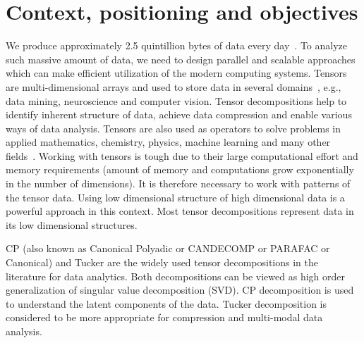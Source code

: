 \documentclass[a4paper,11pt]{article}
\newcommand{\sk}[1]{{\color{blue} \emph{#1}}}
\begin{document}
	\section{Context, positioning and objectives}
	\label{sec:context}
	
	
	We produce approximately 2.5 quintillion bytes of data every day~\cite{data-size}. To analyze such massive amount of data, we need to design parallel and scalable approaches which can make efficient utilization of the modern computing systems. Tensors are multi-dimensional arrays and used to store data in several domains~\cite{KB-SIAM-2009}, e.g., data mining, neuroscience and computer vision. Tensor decompositions help to identify inherent structure of data, achieve data compression and enable various ways of data analysis. Tensors are also used as operators to solve problems in applied mathematics, chemistry, physics, machine learning and many other fields~\cite{KB-SIAM-2009,NPOV-NIPS-2015}. Working with tensors is tough due to their large computational effort and memory requirements (amount of memory and computations grow exponentially in the number of dimensions). It is therefore necessary to work with patterns of the tensor data. Using low dimensional structure of high dimensional data is a powerful approach in this context. Most tensor decompositions represent data in its low dimensional structures.
		
	
	
	CP (also known as Canonical Polyadic or CANDECOMP or PARAFAC or Canonical) and Tucker are the widely used tensor decompositions in the literature for data analytics. Both decompositions can be viewed as high order generalization of singular value decomposition (SVD). CP decomposition is used to understand the latent components of the data. Tucker decomposition is considered to be more appropriate for compression and multi-modal data analysis.
	
\end{document}

